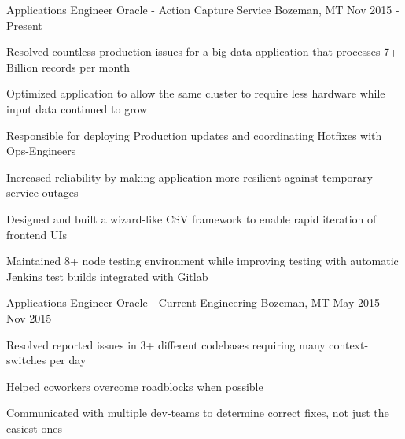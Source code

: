 

\begin{cventries}

  \cventry
    {Applications Engineer} %
    {Oracle - Action Capture Service} %
    {Bozeman, MT} %
    {Nov 2015 - Present} %
    {
      \begin{cvitems} %
        \item {Resolved countless production issues for a big-data application that processes 7+ Billion records per month}
        \item {Optimized application to allow the same cluster to require less hardware while input data continued to grow}
        \item {Responsible for deploying Production updates and coordinating Hotfixes with Ops-Engineers}
        \item {Increased reliability by making application more resilient against temporary service outages}
        \item {Designed and built a wizard-like CSV framework to enable rapid iteration of frontend UIs}
        \item {Maintained 8+ node testing environment while improving testing with automatic Jenkins test builds integrated with Gitlab}
      \end{cvitems}
    }

  \cventry
    {Applications Engineer} %
    {Oracle - Current Engineering} %
    {Bozeman, MT} %
    {May 2015 - Nov 2015} %
    {
      \begin{cvitems} %
        \item {Resolved reported issues in 3+ different codebases requiring many context-switches per day}
        \item {Helped coworkers overcome roadblocks when possible}
        \item {Communicated with multiple dev-teams to determine correct fixes, not just the easiest ones}
      \end{cvitems}
    }


\end{cventries}

